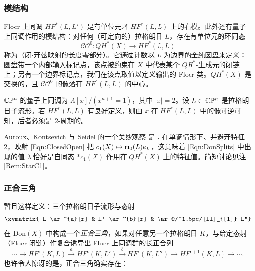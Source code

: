 \subsubsection{模结构}\label{Subsec:ModuleStructures}

Floer 上同调 $HF^*(L, L')$ 是有单位元环 $HF^*(L,L)$ 上的右模。此外还有量子上同调作用的模结构：对任何（可定向的）拉格朗日 $L$，存在有单位元的环同态
\begin{equation} \label{Eqn:ClosedOpen}
\mathcal{CO}^0: QH^*(X) \longrightarrow HF^*(L,L)
\end{equation}
称为（闭-开弦映射的长度零部分）。它通过计数以 $L$ 为边界的全纯圆盘来定义：圆盘带一个内部输入标记点，该点被约束在 $X$ 中代表某个 $QH^*$-生成元的闭链上；另有一个边界标记点，我们在该点取值以定义输出的 Floer 类。$QH^*(X)$ 是交换的，且 $\mathcal{CO}^0$ 的像落在 $HF^*(L,L)$ 的中心。

\begin{Example}
$\bC\bP^n$ 的量子上同调为 $\Lambda[x]/(x^{n+1}=1)$，其中 $|x|=2$。设 $L\subset \bC\bP^n$ 是拉格朗日子流形。若 $HF^*(L,L)$ 有良好定义，则由 $x$ 在 $HF^*(L,L)$ 中的像可逆可知，后者必须是 2-周期的。
\end{Example}

Auroux、Kontsevich 与 Seidel 的一个美妙观察 \cite{Auroux} 是：在单调情形下、并避开特征 2，映射 \eqref{Eqn:ClosedOpen} 把 $c_1(X) \mapsto \frak{m}_0(L) e_L$，这意味着 \eqref{Eqn:DonSplits} 中出现的值 $\lambda$ 恰好是自同态 $\ast c_1(X)$ 作用在 $QH^*(X)$ 上的特征值。简短讨论见注 \ref{Rem:StarC1}。

\subsubsection{正合三角\label{Subsec:ExactTriDon}}

暂且这样定义：三个拉格朗日子流形与态射
\[
\xymatrix{ L \ar^{a}[r] & L' \ar^{b}[r] & \ar@/^1.5pc/[ll]_{[1]} L''}
\]
在 Don$(X)$ 中构成一个\emph{正合三角}，如果对任意另一个拉格朗日 $K$，与给定态射（Floer 闭链）作复合诱导出 Floer 上同调群的长正合列
\[
\cdots  \rightarrow HF^i(K,L) \stackrel{a}{\longrightarrow} HF^i(K,L')\stackrel{b}{\longrightarrow} HF^i(K,L'') \rightarrow HF^{i+1}(K,L) \rightarrow \cdots.
\]
也许令人惊讶的是，正合三角确实存在：

